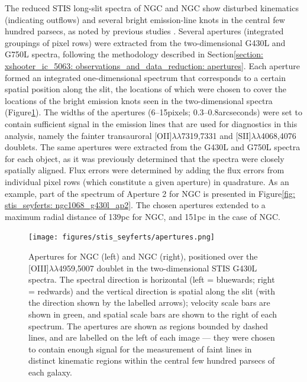 The reduced STIS long-slit spectra of NGC and NGC show disturbed kinematics (indicating outflows) and several bright emission-line knots in the central few hundred parsecs, as noted by previous studies \citep{Crenshaw2000a, Kraemer2000II, Das2005, Das2006, Meena2023}. Several apertures (integrated groupings of pixel rows) were extracted from the two-dimensional G430L and G750L spectra, following the methodology described in Section\;\ref{section: xshooter_ic_5063: observations_and_data_reduction: apertures}. Each aperture formed an integrated one-dimensional spectrum that corresponds to a certain spatial position along the slit, the locations of which were chosen to cover the locations of the bright emission knots seen in the two-dimensional spectra (Figure\;\ref{fig: stis_seyferts: apertures}). The widths of the apertures (6--15\;pixels; 0.3--0.8\;arcseconds) were set to contain sufficient signal in the emission lines that are used for diagnostics in this analysis, namely the fainter transauroral [OII]$\lambda\lambda$7319,7331 and [SII]$\lambda\lambda$4068,4076 doublets. The same apertures were extracted from the G430L and G750L spectra for each object, as it was previously determined that the spectra were closely spatially aligned. Flux errors were determined by adding the flux errors from individual pixel rows (which constitute a given aperture) in quadrature. As an example, part of the spectrum of Aperture 2 for NGC is presented in Figure\;\ref{fig: stis_seyferts: ngc1068_g430l_ap2}. The chosen apertures extended to a maximum radial distance of 139\;pc for NGC, and 151\;pc in the case of NGC.

\begin{figure}[!ht]
	\texttt{[image: figures/stis\_seyferts/apertures.png]}
	\caption[Long-slit spectra of NGC and NGC, with the positions and sizes of extracted apertures overlaid.]{Apertures for NGC (left) and NGC (right), positioned over the [OIII]$\lambda\lambda$4959,5007 doublet in the two-dimensional STIS G430L spectra. The spectral direction is horizontal (left = bluewards; right = redwards) and the vertical direction is spatial along the slit (with the direction shown by the labelled arrows); velocity scale bars are shown in green, and spatial scale bars are shown to the right of each spectrum. The apertures are shown as regions bounded by dashed lines, and are labelled on the left of each image --- they were chosen to contain enough signal for the measurement of faint lines in distinct kinematic regions within the central few hundred parsecs of each galaxy.}
	\label{fig: stis_seyferts: apertures}
\end{figure}

